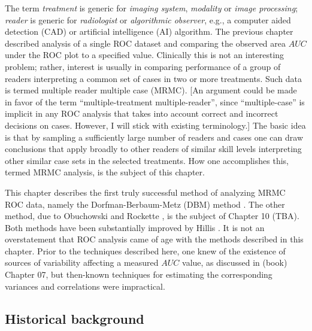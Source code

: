 \documentclass[
]{book}
\begin{document}
The term \emph{treatment} is generic for \emph{imaging system}, \emph{modality} or \emph{image processing}; \emph{reader} is generic for \emph{radiologist} or \emph{algorithmic observer}, e.g., a computer aided detection (CAD) or artificial intelligence (AI) algorithm. The previous chapter described analysis of a single ROC dataset and comparing the observed area \(AUC\) under the ROC plot to a specified value. Clinically this is not an interesting problem; rather, interest is usually in comparing performance of a group of readers interpreting a common set of cases in two or more treatments. Such data is termed multiple reader multiple case (MRMC). {[}An argument could be made in favor of the term ``multiple-treatment multiple-reader'', since ``multiple-case'' is implicit in any ROC analysis that takes into account correct and incorrect decisions on cases. However, I will stick with existing terminology.{]} The basic idea is that by sampling a sufficiently large number of readers and cases one can draw conclusions that apply broadly to other readers of similar skill levels interpreting other similar case sets in the selected treatments. How one accomplishes this, termed MRMC analysis, is the subject of this chapter.

This chapter describes the first truly successful method of analyzing MRMC ROC data, namely the Dorfman-Berbaum-Metz (DBM) method \citep{RN204}. The other method, due to Obuchowski and Rockette \citep{RN1450}, is the subject of Chapter 10 (TBA). Both methods have been substantially improved by Hillis \citep{RN1866, RN1865, RN2508}. It is not an overstatement that ROC analysis came of age with the methods described in this chapter. Prior to the techniques described here, one knew of the existence of sources of variability affecting a measured \(AUC\) value, as discussed in (book) Chapter 07, but then-known techniques \citep{RN412} for estimating the corresponding variances and correlations were impractical.

\hypertarget{historical-background}{%
\subsection{Historical background}\label{historical-background}}
\end{document}
